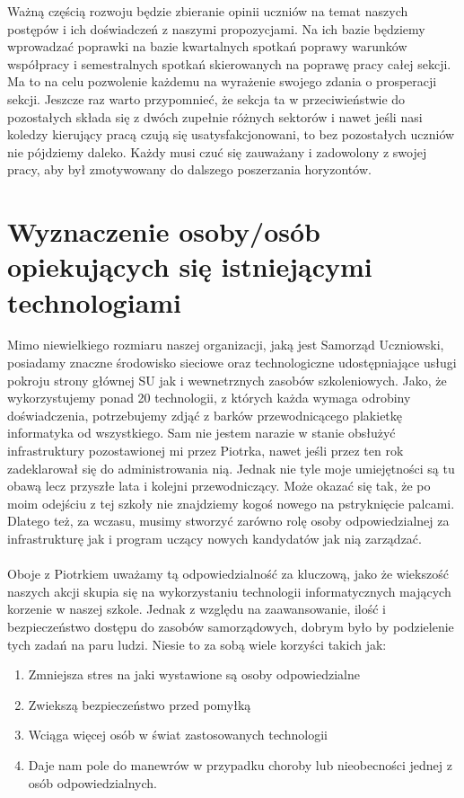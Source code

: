 \documentclass[9pt,a4paper]{report}
\begin{document}
Ważną częścią rozwoju będzie zbieranie opinii uczniów na temat naszych postępów i ich doświadczeń z naszymi propozycjami. Na ich bazie będziemy wprowadzać poprawki na bazie kwartalnych spotkań poprawy warunków współpracy i semestralnych spotkań skierowanych na poprawę pracy całej sekcji. Ma to na celu pozwolenie każdemu na wyrażenie swojego zdania o prosperacji sekcji. Jeszcze raz warto przypomnieć, że sekcja ta w przeciwieństwie do pozostałych składa się z dwóch zupełnie różnych sektorów i nawet jeśli nasi koledzy kierujący pracą czują się usatysfakcjonowani, to bez pozostałych uczniów nie pójdziemy daleko. Każdy musi czuć się zauważany i zadowolony z swojej pracy, aby był zmotywowany do dalszego poszerzania horyzontów.\\

\section{Wyznaczenie osoby/osób opiekujących się istniejącymi technologiami}

Mimo niewielkiego rozmiaru naszej organizacji, jaką jest Samorząd Uczniowski, posiadamy znaczne środowisko sieciowe oraz technologiczne udostępniające usługi pokroju strony głównej SU jak i wewnetrznych zasobów szkoleniowych. Jako, że wykorzystujemy ponad 20 technologii, z których każda wymaga odrobiny doświadczenia, potrzebujemy zdjąć z barków przewodnicącego plakietkę informatyka od wszystkiego. Sam nie jestem narazie w stanie obsłużyć infrastruktury pozostawionej mi przez Piotrka, nawet jeśli przez ten rok zadeklarował się do administrowania nią. Jednak nie tyle moje umiejętności są tu obawą lecz przyszłe lata i kolejni przewodniczący. Może okazać się tak, że po moim odejściu z tej szkoły nie znajdziemy kogoś nowego na pstryknięcie palcami. Dlatego też, za wczasu, musimy stworzyć zarówno rolę osoby odpowiedzialnej za infrastrukturę jak i program uczący nowych kandydatów jak nią zarządzać.\\\\
Oboje z Piotrkiem uważamy tą odpowiedzialność za kluczową, jako że wiekszość naszych akcji  skupia się na wykorzystaniu technologii informatycznych mających korzenie w naszej szkole. Jednak z względu na zaawansowanie, ilość i bezpieczeństwo dostępu do zasobów samorządowych, dobrym było by podzielenie tych zadań na paru ludzi. Niesie to za sobą wiele korzyści takich jak:\\
\begin{enumerate}
\item Zmniejsza stres na jaki wystawione są osoby odpowiedzialne
\item Zwiekszą bezpieczeństwo przed pomyłką
\item Wciąga więcej osób w świat zastosowanych technologii
\item Daje nam pole do manewrów w przypadku choroby lub nieobecności jednej z osób odpowiedzialnych.
\end{enumerate}
\end{document}
